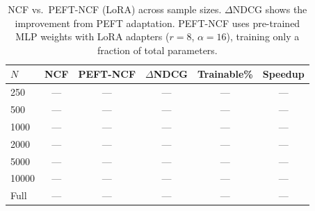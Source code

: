 \begin{table}[htbp]
\centering
\caption{NCF vs.\ PEFT-NCF (LoRA) across sample sizes. $\Delta$NDCG shows the improvement from PEFT adaptation. PEFT-NCF uses pre-trained MLP weights with LoRA adapters ($r = 8$, $\alpha = 16$), training only a fraction of total parameters.}
\label{tab:rq5}
\begin{tabular}{lccccc}
\toprule
$N$ & NCF & PEFT-NCF & $\Delta$NDCG & Trainable\% & Speedup \\
\midrule
  250 & --- & --- & --- & --- & --- \\
  500 & --- & --- & --- & --- & --- \\
  1000 & --- & --- & --- & --- & --- \\
  2000 & --- & --- & --- & --- & --- \\
  5000 & --- & --- & --- & --- & --- \\
  10000 & --- & --- & --- & --- & --- \\
  Full & --- & --- & --- & --- & --- \\
\bottomrule
\end{tabular}
\end{table}
